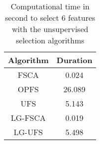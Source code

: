 \begin{table}
	\begin{center}
		\begin{tabular}{c c}
			Algorithm & Duration \\
			\hline
			FSCA & 0.024 \\
			OPFS & 26.089 \\
			UFS & 5.143 \\
			LG-FSCA & 0.019 \\
			LG-UFS & 5.498 \\
		\end{tabular}
	\end{center}
	\caption{Computational time in second to select 6 features with the unsupervised selection algorithms}
\end{table}